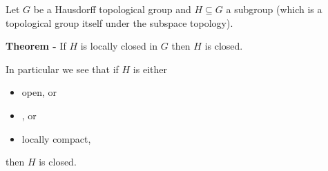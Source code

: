 \documentclass[12pt]{article}
\begin{document}
Let $G$ be a Hausdorff topological group and $H \subseteq G$ a subgroup (which is a topological group itself under the subspace topology).

{\bf Theorem -} If $H$ is locally closed in $G$ then $H$ is closed.

In particular we see that if $H$ is either
\begin{itemize}
\item open, or
\item {}, or
\item locally compact,
\end{itemize}
then $H$ is closed.
\end{document}
